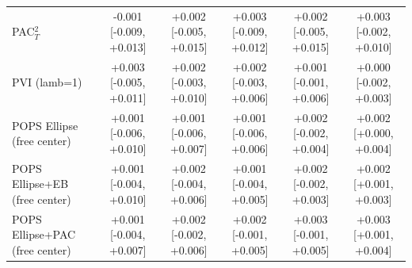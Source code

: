 \begin{tabular}{lccccc}
PAC$^2_T$ & -0.001 {\scriptsize[-0.009, +0.013]} & +0.002 {\scriptsize[-0.005, +0.015]} & +0.003 {\scriptsize[-0.009, +0.012]} & +0.002 {\scriptsize[-0.005, +0.015]} & +0.003 {\scriptsize[-0.002, +0.010]} \\
PVI (lamb=1) & +0.003 {\scriptsize[-0.005, +0.011]} & +0.002 {\scriptsize[-0.003, +0.010]} & +0.002 {\scriptsize[-0.003, +0.006]} & +0.001 {\scriptsize[-0.001, +0.006]} & +0.000 {\scriptsize[-0.002, +0.003]} \\
POPS Ellipse (free center) & +0.001 {\scriptsize[-0.006, +0.010]} & +0.001 {\scriptsize[-0.006, +0.007]} & +0.001 {\scriptsize[-0.006, +0.006]} & +0.002 {\scriptsize[-0.002, +0.004]} & +0.002 {\scriptsize[+0.000, +0.004]} \\
POPS Ellipse+EB (free center) & +0.001 {\scriptsize[-0.004, +0.010]} & +0.002 {\scriptsize[-0.004, +0.006]} & +0.001 {\scriptsize[-0.004, +0.005]} & +0.002 {\scriptsize[-0.002, +0.003]} & +0.002 {\scriptsize[+0.001, +0.003]} \\
POPS Ellipse+PAC (free center) & +0.001 {\scriptsize[-0.004, +0.007]} & +0.002 {\scriptsize[-0.002, +0.006]} & +0.002 {\scriptsize[-0.001, +0.005]} & +0.003 {\scriptsize[-0.001, +0.005]} & +0.003 {\scriptsize[+0.001, +0.004]} \\
\bottomrule
\end{tabular}

